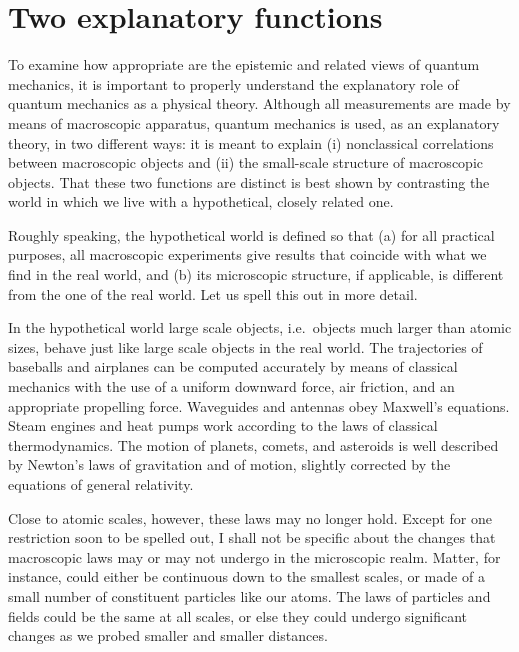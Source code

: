 \documentclass[12pt]{article}
\begin{document}
\section{Two explanatory functions}
%
To examine how appropriate are the epistemic
and related views of quantum mechanics, it is important
to properly understand the explanatory role of
quantum mechanics as a physical theory.
Although all measurements are made
by means of macroscopic apparatus, quantum
mechanics is used, as an explanatory theory,
in two different ways: it is meant to explain
(i) nonclassical correlations between macroscopic
objects and (ii) the small-scale structure of
macroscopic objects.  That these two functions
are distinct is best shown by contrasting the world
in which we live with a hypothetical, closely
related one.

Roughly speaking, the hypothetical world is defined
so that (a) for all practical purposes,
all macroscopic experiments give results
that coincide with what we find in the real world,
and (b) its microscopic structure, if applicable,
is different from the one of the real world.  Let
us spell this out in more detail.

In the hypothetical world large scale objects,
i.e.\ objects much larger than atomic sizes, behave
just like large scale objects in the
real world.  The trajectories of baseballs and
airplanes can be computed accurately by means
of classical mechanics with the use of a
uniform downward force, air friction, and an
appropriate propelling force.  Waveguides and
antennas obey Maxwell's equations.  Steam engines and
heat pumps work according to the laws of
classical thermodynamics.  The motion of planets,
comets, and asteroids is well described by
Newton's laws of gravitation and of motion,
slightly corrected by the equations of
general relativity.

Close to atomic scales, however, these laws
may no longer hold.  Except for one restriction
soon to be spelled out, I shall not be specific
about the changes that macroscopic laws may or
may not undergo in the microscopic realm.  Matter, for
instance, could either be continuous down to
the smallest scales, or made of a small
number of constituent particles like our
atoms.  The laws of particles and fields
could be the same at all scales, or else
they could undergo significant changes
as we probed smaller and smaller distances.
\end{document}
